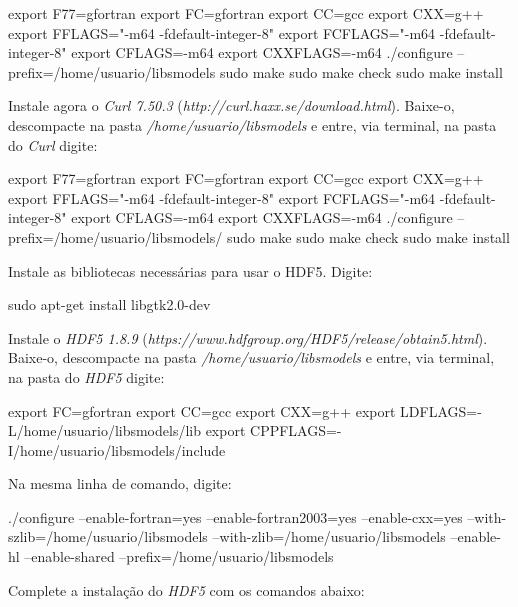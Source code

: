 \begin{bashcode}
export F77=gfortran
export FC=gfortran
export CC=gcc
export CXX=g++
export FFLAGS="-m64 -fdefault-integer-8"
export FCFLAGS="-m64 -fdefault-integer-8"
export CFLAGS=-m64
export CXXFLAGS=-m64
./configure --prefix=/home/usuario/libsmodels
sudo make
sudo make check
sudo make install
\end{bashcode}
\bigskip

\noindent Instale agora o \textit{Curl 7.50.3} (\textcolor{bleu_cite}{\textit{http://curl.haxx.se/download.html}}). Baixe-o, descompacte na pasta \textit{/home/usuario/libsmodels} e entre, via terminal, na pasta do \textit{Curl} digite:
\bigskip

\begin{bashcode}
export F77=gfortran
export FC=gfortran
export CC=gcc
export CXX=g++
export FFLAGS="-m64 -fdefault-integer-8"
export FCFLAGS="-m64 -fdefault-integer-8"
export CFLAGS=-m64
export CXXFLAGS=-m64
./configure --prefix=/home/usuario/libsmodels/
sudo make
sudo make check
sudo make install
\end{bashcode}
\bigskip

\noindent Instale as bibliotecas necessárias para usar o HDF5. Digite:
\bigskip

\begin{bashcode}
sudo apt-get install libgtk2.0-dev
\end{bashcode}
\bigskip

\noindent Instale o \textit{HDF5 1.8.9} (\textcolor{bleu_cite}{\textit{https://www.hdfgroup.org/HDF5/release/obtain5.html}}). Baixe-o, descompacte na pasta \textit{/home/usuario/libsmodels} e entre, via terminal, na pasta do \textit{HDF5} digite:
\bigskip

\begin{bashcode}
export FC=gfortran
export CC=gcc
export CXX=g++
export LDFLAGS=-L/home/usuario/libsmodels/lib
export CPPFLAGS=-I/home/usuario/libsmodels/include
\end{bashcode}
\bigskip

\noindent Na mesma linha de comando, digite:
\bigskip

\begin{bashcode}[fontsize=\footnotesize]
./configure --enable-fortran=yes --enable-fortran2003=yes --enable-cxx=yes
--with-szlib=/home/usuario/libsmodels --with-zlib=/home/usuario/libsmodels --enable-hl
--enable-shared --prefix=/home/usuario/libsmodels
\end{bashcode}
\bigskip

\noindent Complete a instalação do \textit{HDF5} com os comandos abaixo:
\bigskip

